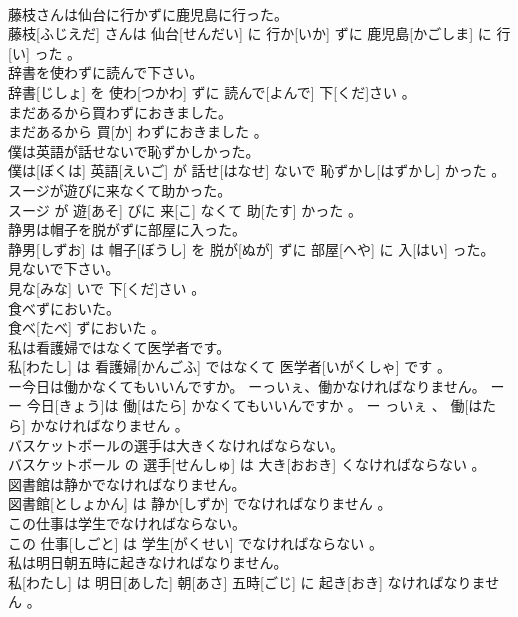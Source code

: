 \documentclass[8pt]{extreport}
\begin{document}
\begin{CJK}{UTF8}{min}
\\	藤枝さんは仙台に行かずに鹿児島に行った。	
\\	藤枝[ふじえだ] さんは 仙台[せんだい] に 行か[いか] ずに 鹿児島[かごしま] に 行[い] った 。
\\	辞書を使わずに読んで下さい。	
\\	辞書[じしょ] を 使わ[つかわ] ずに 読んで[よんで] 下[くだ]さい 。
\\	まだあるから買わずにおきました。	
\\	まだあるから 買[か] わずにおきました 。
\\	僕は英語が話せないで恥ずかしかった。	
\\	僕は[ぼくは] 英語[えいご] が 話せ[はなせ] ないで 恥ずかし[はずかし] かった 。
\\	スージが遊びに来なくて助かった。	
\\	スージ が 遊[あそ] びに 来[こ] なくて 助[たす] かった 。
\\	静男は帽子を脱がずに部屋に入った。	
\\	静男[しずお] は 帽子[ぼうし] を 脱が[ぬが] ずに 部屋[へや] に 入[はい] った。
\\	見ないで下さい。	
\\	見な[みな] いで 下[くだ]さい 。
\\	食べずにおいた。	
\\	食べ[たべ] ずにおいた 。
\\	私は看護婦ではなくて医学者です。	
\\	私[わたし] は 看護婦[かんごふ] ではなくて 医学者[いがくしゃ] です 。
\\	ー今日は働かなくてもいいんですか。 ーっいぇ、働かなければなりません。	ー
\\	ー 今日[きょう]は 働[はたら] かなくてもいいんですか 。 ー っいぇ 、 働[はたら] かなければなりません 。
\\	バスケットボールの選手は大きくなければならない。	
\\	バスケットボール の 選手[せんしゅ] は 大き[おおき] くなければならない 。
\\	図書館は静かでなければなりません。	
\\	図書館[としょかん] は 静か[しずか] でなければなりません 。
\\	この仕事は学生でなければならない。	
\\	この 仕事[しごと] は 学生[がくせい] でなければならない 。
\\	私は明日朝五時に起きなければなりません。	
\\	私[わたし] は 明日[あした] 朝[あさ] 五時[ごじ] に 起き[おき] なければなりません 。

\end{CJK}
\end{document}
